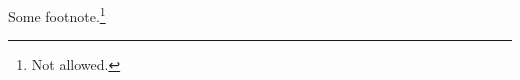\documentclass{article}
\begin{document}
\begin{overview}
Some footnote.\footnote{Not allowed.}
\end{overview}
\end{document}
